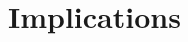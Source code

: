 \documentclass[runningheads]{llncs}
\begin{document}
	\section{Implications}
	
%	

%	
	


	
	
	
\end{document}
